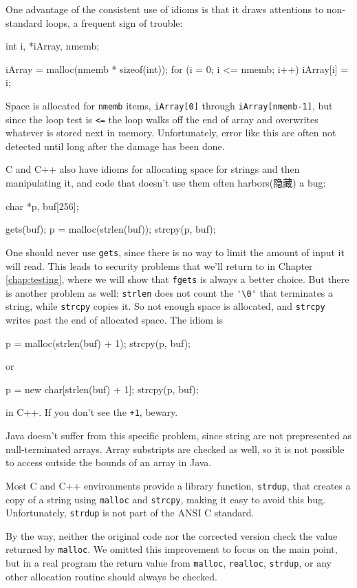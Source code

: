 One advantage of the consistent use of idioms is that it draws attentions
to non-standard loops, a frequent sign of trouble:
\begin{wellcode}
    int i, *iArray, nmemb;

    iArray = malloc(nmemb * sizeof(int));
    for (i = 0; i <= nmemb; i++)
        iArray[i] = i;
\end{wellcode}
Space is allocated for \verb'nmemb' items, \verb'iArray[0]' through
\verb'iArray[nmemb-1]', but since the loop test is \verb'<=' the loop walks
off the end of array and overwrites whatever is stored next in memory.
Unfortunately, error like this are often not detected until long after the
damage has been done.

C and C++ also have idioms for allocating space for strings and then
manipulating it, and code that doesn't use them often harbors(隐藏) a bug:
\begin{badcode}
    char *p, buf[256];

    gets(buf);
    p = malloc(strlen(buf));
    strcpy(p, buf);
\end{badcode}
One should never use \verb'gets', since there is no way to limit the amount
of input it will read. This leads to security problems that we'll return to
in Chapter \ref{chap:testing}, where we will show that \verb'fgets' is
always a better choice. But there is another problem as well:
\verb'strlen' does not count the \verb"'\0'" that terminates a string,
while \verb'strcpy' copies it. So not enough space is allocated, and
\verb'strcpy' writes past the end of allocated space. The idiom is 
\begin{wellcode}
    p = malloc(strlen(buf) + 1);
    strcpy(p, buf);
\end{wellcode}
or 
\begin{wellcode}
    p = new char[strlen(buf) + 1];
    strcpy(p, buf);
\end{wellcode}
in C++. If you don't see the \verb'+1', bewary.

Java doesn't suffer from this specific problem, since string are not
prepresented as null-terminated arrays. Array substripts are checked as
well, so it is not possible to access outside the bounds of an array in Java.

Most C and C++ environments provide a library function, \verb'strdup', that
creates a copy of a string using \verb'malloc' and \verb'strcpy', making it
easy to avoid this bug. Unfortunately, \verb'strdup' is not part of the
ANSI C standard.

By the way, neither the original code nor the corrected version check the
value returned by \verb'malloc'. We omitted this improvement to focus on
the main point, but in a real program the return value from \verb'malloc',
\verb'realloc', \verb'strdup', or any other allocation routine should
always be checked.

